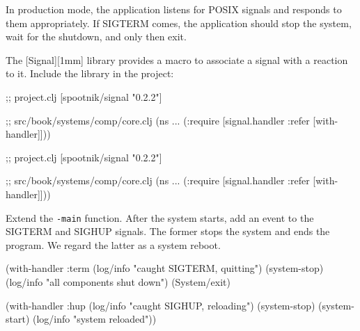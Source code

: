 
In production mode, the application listens for POSIX signals and responds to them appropriately. If SIGTERM comes, the application should stop the system, wait for the shutdown, and only then exit.


The [Signal][1mm] library provides a macro to associate a signal with a reaction to it. Include the library in the project:

\ifnarrow

\begin{english}
  \begin{clojure}
;; project.clj
[spootnik/signal "0.2.2"]

;; src/book/systems/comp/core.clj
(ns ...
  (:require
   [signal.handler :refer
    [with-handler]]))
  \end{clojure}
\end{english}

\else

\begin{english}
  \begin{clojure}
;; project.clj
[spootnik/signal "0.2.2"]

;; src/book/systems/comp/core.clj
(ns ...
  (:require [signal.handler :refer [with-handler]]))
  \end{clojure}
\end{english}

\fi

Extend the \verb|-main| function. After the system starts, add an event to the SIGTERM and SIGHUP signals. The former stops the system and ends the program. We regard the latter as a system reboot.

\begin{english}
  \begin{clojure}
(with-handler :term
  (log/info "caught SIGTERM, quitting")
  (system-stop)
  (log/info "all components shut down")
  (System/exit)
  \end{clojure}
\end{english}


\begin{english}
  \begin{clojure}
(with-handler :hup
  (log/info "caught SIGHUP, reloading")
  (system-stop)
  (system-start)
  (log/info "system reloaded"))
  \end{clojure}
\end{english}

